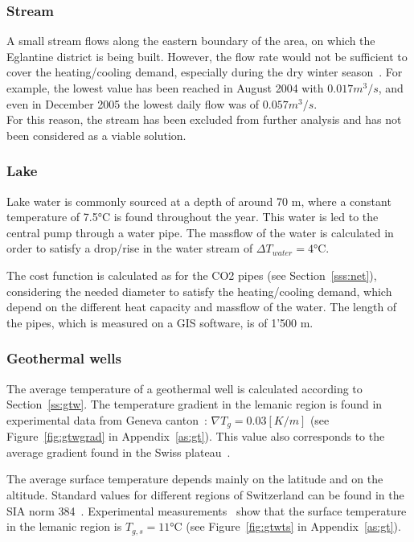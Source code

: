 \documentclass{article}
\begin{document}
\subsubsection{Stream}
A small stream flows along the eastern boundary of the area, on which the Eglantine district is being built. However, the flow rate would not be sufficient to cover the heating/cooling demand, especially during the dry winter season~\cite{veillehydro-meteorologiqueducantondevaudMorgesRiviere}. For example, the lowest value has been reached in August 2004 with $0.017 m^3/s$, and even in December 2005 the lowest daily flow was of $0.057 m^3/s$. \\
For this reason, the stream has been excluded from further analysis and has not been considered as a viable solution.

\subsubsection{Lake}
Lake water is commonly sourced at a depth of around 70 m, where a constant temperature of 7.5\si{\celsius} is found throughout the year. This water is led to the central pump through a water pipe. The massflow of the water is calculated in order to satisfy a drop/rise in the water stream of $\Delta T_{water}  = 4 \si{\celsius}$.

The cost function is calculated as for the CO2 pipes (see Section~\ref{sss:net}), considering the needed diameter to satisfy the heating/cooling demand, which depend on the different heat capacity and massflow of the water. The length of the pipes, which is measured on a GIS software, is of 1'500 m.


\subsubsection{Geothermal wells}
The average temperature of a geothermal well is calculated according to Section~\ref{ss:gtw}. The temperature gradient in the lemanic region is found in experimental data from Geneva canton~\cite{gadzEvaluationPotentielGeothermique2011}: $\nabla T_{g} = 0.03 [K/m]$ (see Figure~\ref{fig:gtwgrad} in Appendix~\ref{as:gt}).
This value also corresponds to the average gradient found in the Swiss plateau~\cite{siaSIA384Sondes2010}.

The average surface temperature depends mainly on the latitude and on the altitude. Standard values for different regions of Switzerland can be found in the SIA norm 384~\cite{siaSIA384Sondes2010}. Experimental measurements~\cite{gadzEvaluationPotentielGeothermique2011} show that the surface temperature in the lemanic region is $	T_{g,s} = 11 \si{\celsius}$ (see Figure~\ref{fig:gtwts} in Appendix~\ref{as:gt}).
\end{document}
